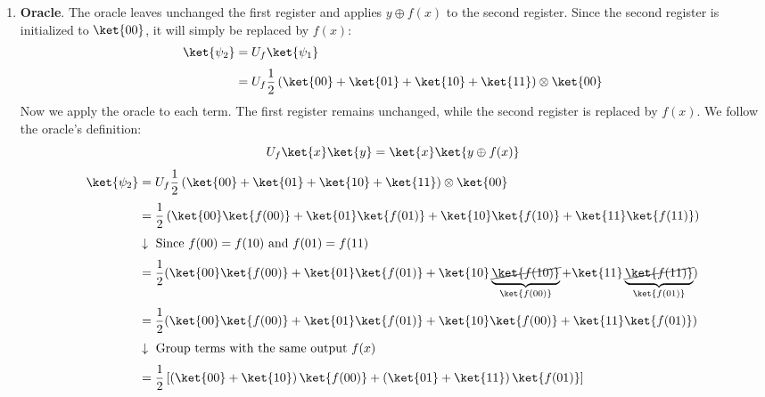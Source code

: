\begin{enumerate}[label={\textbf{Step \arabic*.}}, leftmargin=2cm]
    \item \textbf{Oracle}. The oracle leaves unchanged the first register and applies $y \oplus f(x)$ to the second register. Since the second register is initialized to $\ket{00}$, it will simply be replaced by $f(x)$:
        \begin{align*}
            \ket{\psi_2} &= U_f \ket{\psi_1} \\[.3em]
            &= U_f \frac{1}{2} \left(
                \ket{00} + \ket{01} + \ket{10} + \ket{11}
            \right) \otimes \ket{00}
        \end{align*}
        Now we apply the oracle to each term. The first register remains unchanged, while the second register is replaced by $f(x)$. We follow the oracle's definition:
        \begin{equation*}
            U_f \ket{x} \ket{y} = \ket{x} \ket{y \oplus f(x)}
        \end{equation*}
        \begin{align*}
            \ket{\psi_2} &= U_f \frac{1}{2} \left(
                \ket{00} + \ket{01} + \ket{10} + \ket{11}
            \right) \otimes \ket{00} \\[.3em]
            &= \frac{1}{2} \left(
                \ket{00} \ket{f(00)} +
                \ket{01} \ket{f(01)} +
                \ket{10} \ket{f(10)} +
                \ket{11} \ket{f(11)}
            \right) \\[.3em]
            &\downarrow \text{ Since } f(00) = f(10) \text{ and } f(01) = f(11) \\[.3em]
            &= \frac{1}{2} (
                \ket{00} \ket{f(00)} +
                \ket{01} \ket{f(01)} +
                \ket{10} \underbrace{\cancel{\ket{f(10)}}}_{\ket{f(00)}} +
                \ket{11} \underbrace{\cancel{\ket{f(11)}}}_{\ket{f(01)}}
            ) \\[.3em]
            &= \frac{1}{2} (
                \ket{00} \ket{f(00)} +
                \ket{01} \ket{f(01)} +
                \ket{10} \ket{f(00)} +
                \ket{11} \ket{f(01)}
            ) \\[.3em]
            &\downarrow \text{ Group terms with the same output } f(x) \\[.3em]
            &= \frac{1}{2} \left[
                \left(\ket{00} + \ket{10}\right) \ket{f(00)} +
                \left(\ket{01} + \ket{11}\right) \ket{f(01)}
            \right]
        \end{align*}


\end{enumerate}
